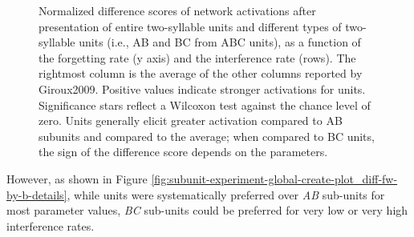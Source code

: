 \documentclass[
]{article}
\begin{document}
\begin{figure}
\caption{Normalized difference scores of network activations after presentation of entire two-syllable units and different types of two-syllable units (i.e., AB and BC from ABC units), as a function of the forgetting rate (y axis) and the interference rate (rows). The rightmost column is the average of the other columns reported by Giroux2009. Positive values indicate stronger activations for units. Significance stars reflect a Wilcoxon test against the chance level of zero. Units generally elicit greater activation compared to AB subunits and compared to the average; when compared to BC units, the sign of the difference score depends on the parameters.}\label{figsubunit-experiment-global-create-plot_diff-fw-by-b-average}
\end{figure}

However, as shown in Figure
\ref{fig:subunit-experiment-global-create-plot_diff-fw-by-b-details},
while units were systematically preferred over \emph{AB} sub-units for
most parameter values, \emph{BC} sub-units could be preferred for very
low or very high interference rates.
\end{document}
